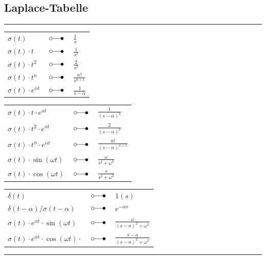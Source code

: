 	\subsection{Laplace-Tabelle}
	\hrule
	\begin{multicols}{3}
		\begin{center}
			\begin{tabular}{p{2cm}p{0.75cm}p{2cm}}
				
				$\sigma \left( t \right)$ & $\; \laplace \;$ & $\frac{1}{s}$ \\
				$\sigma \left( t \right) \cdot t$ & $\; \laplace \;$ & $\frac{1}{s^2}$\\
				$\sigma \left( t \right) \cdot t^2$ & $\; \laplace \;$ & $\frac{2}{s^3}$\\
				$\sigma \left( t \right) \cdot t^n$ & $\; \laplace \;$ & $\frac{n!}{s^{n+1}}$\\
				$\sigma \left( t \right) \cdot e^{\alpha t}$ & $\; \laplace \;$ &
				$\frac{1}{s-\alpha}$\\
			\end{tabular}
		\end{center}
	\columnbreak
		\begin{center}
			\begin{tabular}{p{2cm}p{0.75cm}p{2cm}}
				$\sigma \left( t \right) \cdot t \cdot e^{\alpha t}$ & $\; \laplace \;$ &
				$\frac{1}{( s - \alpha )^2}$\\
				$\sigma \left( t \right)\cdot t^2 \cdot e^{\alpha t}$ &
				$\; \laplace \;$ & $\frac{2}{{( s - \alpha )}^3}$\\
				$\sigma \left( t \right)\cdot t^n \cdot e^{ \alpha t}$ &
				$\; \laplace \;$ & $\frac{n!}{(s-\alpha)^{n+1}}$\\
				$\sigma \left( t \right) \cdot \sin \left(\omega t \right)$ & $\; \laplace \;$ &
				$\frac{\omega}{s^2 + {\omega^2}}$\\
				$\sigma \left( t \right) \cdot \cos \left( \omega t \right)$ & $\; \laplace \;$ &
				$\frac{s}{ s^2 + \omega^2}$\\
			\end{tabular}
		\end{center}
	\columnbreak
\begin{center}
	\begin{tabular}{p{3cm}p{0.75cm}p{2cm}}
		$\delta \left( t \right)$ & $\; \laplace \;$ & $1\left( s \right)$ \\
		$\delta \left( t - \alpha \right) / \sigma\left( t - \alpha \right)$ & $\; \laplace \;$ & $e^{- \alpha s}$\\
		$\sigma \left( t \right) \cdot  e^{ \alpha t} \cdot \sin \left(\omega t \right)$ & $\; \laplace \;$ 
		& 	$\frac{\omega}{(s-a)^2 + {\omega^2}}$\\
		$\sigma \left( t \right) \cdot e^{ \alpha t} \cdot \cos \left( \omega t \right) \cdot $ & $\; \laplace \;$ &
		$\frac{s-a}{(s-a)^2 + \omega^2}$\\
	\end{tabular}
\end{center}
\end{multicols}
\hrule
		
